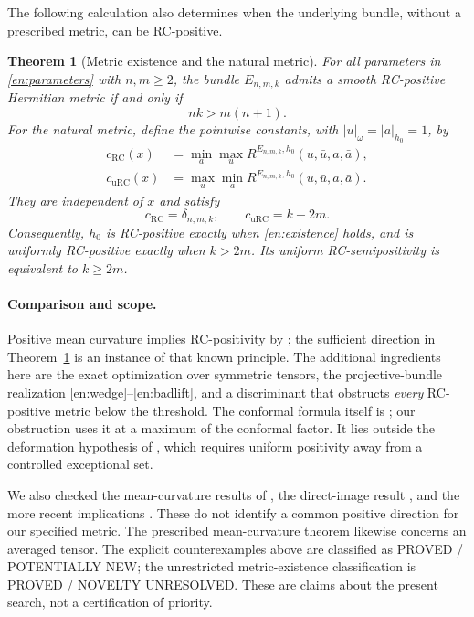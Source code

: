 \documentclass[12pt]{amsart}
\newtheorem{thm}{Theorem}[section]
\theoremstyle{definition}
\theoremstyle{remark}
\numberwithin{equation}{section}
\newcommand{\urc}{\mathrm{uRC}}
\newcommand{\rc}{\mathrm{RC}}
\newcommand{\E}{E_{n,m,k}}
\newcommand{\cst}{\delta_{n,m,k}}
\newcommand{\state}[2]{\textnormal{\textsf{#1 / #2}}}
\newcommand{\eref}[1]{\eqref{en:#1}}
\begin{document}
The following calculation also determines when the underlying bundle, without a prescribed metric, can be RC-positive.

\begin{thm}[Metric existence and the natural metric]\label{en:classification}
For all parameters in \eref{parameters} with $n,m\ge2$, the bundle $\E$ admits a smooth RC-positive Hermitian metric if and only if
\begin{equation}\label{en:existence}
nk>m(n+1).
\end{equation}
For the natural metric, define the pointwise constants, with $|u|_\omega=|a|_{h_0}=1$, by
\begin{align}
c_{\rc}(x)&=\min_a\max_u R^{\E,h_0}(u,\bar u,a,\bar a),\label{en:rcconstant}\\
c_{\urc}(x)&=\max_u\min_a R^{\E,h_0}(u,\bar u,a,\bar a).\label{en:urcconstant}
\end{align}
They are independent of $x$ and satisfy
\begin{equation}\label{en:constants}
c_{\rc}=\cst,\qquad c_{\urc}=k-2m.
\end{equation}
Consequently, $h_0$ is RC-positive exactly when \eref{existence} holds, and is uniformly RC-positive exactly when $k>2m$. Its uniform RC-semipositivity is equivalent to $k\ge2m$.
\end{thm}

\paragraph{Comparison and scope.}
Positive mean curvature implies RC-positivity by \cite[Theorem~3.6]{en:Y18}; the sufficient direction in Theorem~\ref{en:classification} is an instance of that known principle. The additional ingredients here are the exact optimization over symmetric tensors, the projective-bundle realization \eref{wedge}--\eref{badlift}, and a discriminant that obstructs \emph{every} RC-positive metric below the threshold. The conformal formula itself is \cite[Lemma~3.4]{en:Y20}; our obstruction uses it at a maximum of the conformal factor. It lies outside the deformation hypothesis of \cite[Theorem~3.5]{en:Y20}, which requires uniform positivity away from a controlled exceptional set.

We also checked the mean-curvature results of \cite[Theorem~1.4]{en:LZZ}, the direct-image result \cite[Theorem~3]{en:Wu25}, and the more recent implications \cite[Theorems~3 and~7]{en:Wu26}. These do not identify a common positive direction for our specified metric. The prescribed mean-curvature theorem \cite[Theorem~1.1]{en:WYY} likewise concerns an averaged tensor. The explicit counterexamples above are classified as \state{PROVED}{POTENTIALLY NEW}; the unrestricted metric-existence classification is \state{PROVED}{NOVELTY UNRESOLVED}. These are claims about the present search, not a certification of priority.
\end{document}

